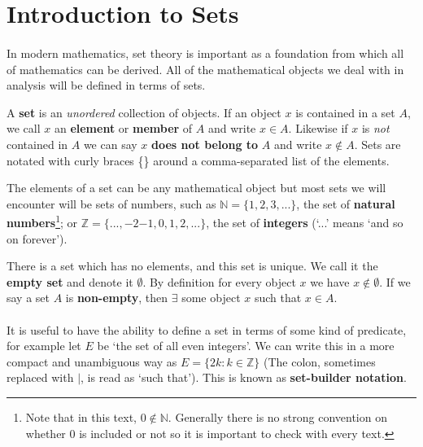 \documentclass[../real_analysis.tex]{subfiles}
\begin{document}
    \section{Introduction to Sets}
        \paragraph{}
        In modern mathematics, set theory is important as a foundation from which all of mathematics can be derived. All of the mathematical objects we deal with in analysis will be defined in terms of sets.
        \begin{definition}
            A \textbf{set} is an \textit{unordered} collection of objects. If an object $x$ is contained in a set $A$, we call $x$ an \textbf{element} or \textbf{member} of $A$ and write $x \in A$. Likewise if $x$ is \textit{not} contained in $A$ we can say $x$ \textbf{does not belong to} $A$ and write $x \notin A$. Sets are notated with curly braces \{\} around a comma-separated list of the elements.
        \end{definition}
        The elements of a set can be any mathematical object but most sets we will encounter will be sets of numbers, such as $\mathbb{N}=\{1, 2, 3, ...\}$, the set of \textbf{natural numbers}\footnote{Note that in this text, $0 \notin \mathbb{N}$. Generally there is no strong convention on whether 0 is included or not so it is important to check with every text.}; or $\mathbb{Z}=\{..., {-2} {-1}, 0, 1, 2, ...\}$, the set of \textbf{integers} (`...' means `and so on forever').

        \begin{definition}
            There is a set which has no elements, and this set is unique. We call it the \textbf{empty set} and denote it $\emptyset$. By definition for every object $x$ we have $x \notin \emptyset$. If we say a set $A$ is \textbf{non-empty}, then $\exists$ some object $x$ such that $x \in A$.
        \end{definition}

        \paragraph{}
        It is useful to have the ability to define a set in terms of some kind of predicate, for example let $E$ be `the set of all even integers'. We can write this in a more compact and unambiguous way as $E = \{2k : k \in \mathbb{Z}\}$ (The colon, sometimes replaced with $|$, is read as `such that'). This is known as \textbf{set-builder notation}.
\end{document}
